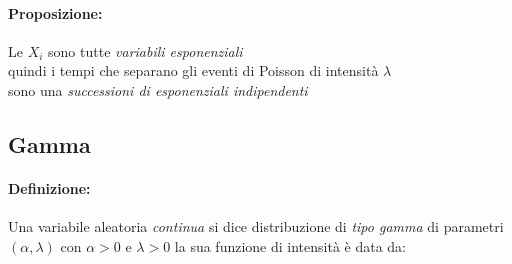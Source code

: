 \documentclass[]{article}
\newcommand{\definizione}{\paragraph{Definizione:}}
\begin{document}
    \paragraph{Proposizione:} Le $X_i$ sono tutte \textit{variabili esponenziali} \\
    quindi i tempi che separano gli eventi di Poisson di intensità $\lambda$ \\
    sono una \textit{successioni di esponenziali indipendenti} 

    \subsection{Gamma}
    \definizione Una variabile aleatoria \textit{continua} si dice distribuzione di \textit{tipo gamma}
    di parametri $(\alpha, \lambda)$ con $\alpha > 0$ e $\lambda > 0$ la sua funzione di intensità è data da:
\end{document}
